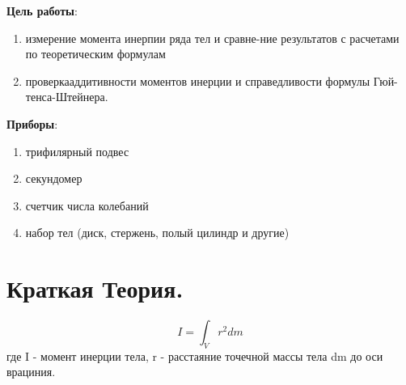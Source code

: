 \documentclass[a4paper,12pt]{article} %
\begin{document}

\textbf{Цель работы}:
\begin{enumerate}
  \item измерение момента инерпии ряда тел и сравне-ние результатов с расчетами по теоретическим формулам
  \item проверкааддитивности моментов инерции и справедливости формулы Гюй-тенса-Штейнера.
\end{enumerate}

\textbf{Приборы}:
\begin{enumerate}
\item трифилярный подвес
\item секундомер
\item счетчик числа колебаний
\item набор тел (диск, стержень, полый цилиндр и другие)
\end{enumerate}

\section{Краткая Теория.}

\begin{equation}
  I = \int_{V}{r^2 dm} \label{eq:1}
\end{equation}
где I - момент инерции тела, r - расстаяние точечной массы тела dm до оси врациния.

\begin{figure} [H]
\end{figure}
\end{document}
